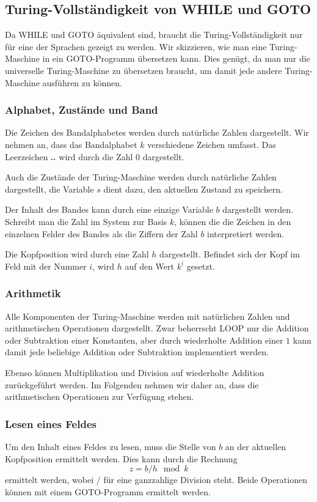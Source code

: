 \subsection{Turing-Vollständigkeit von WHILE und GOTO}
Da WHILE und GOTO äquivalent sind, braucht die Turing-Vollständigkeit
nur für eine der Sprachen gezeigt zu werden.
Wir skizzieren, wie man eine Turing-Maschine in ein GOTO-Programm
übersetzen kann. Dies genügt, da man nur die universelle
Turing-Maschine zu übersetzen braucht, um damit jede andere
Turing-Maschine ausführen zu können.

\subsubsection{Alphabet, Zustände und Band}
Die Zeichen des Bandalphabetes werden durch natürliche Zahlen
dargestellt.  Wir nehmen an, dass das Bandalphabet $k$ verschiedene Zeichen
umfasst. Das Leerzeichen $\text{\textvisiblespace}$ wird durch die Zahl $0$
dargestellt.

Auch die Zustände der Turing-Maschine werden durch natürliche Zahlen
dargestellt,
die Variable $s$ dient dazu, den aktuellen Zustand zu
speichern.

Der Inhalt des Bandes kann durch eine einzige Variable $b$ dargestellt
werden. Schreibt man die Zahl im System zur Basis $k$, können die
die Zeichen in den einzelnen Felder des Bandes als die Ziffern
der Zahl $b$ interpretiert werden.

Die Kopfposition wird durch eine Zahl $h$ dargestellt. Befindet sich
der Kopf im Feld mit der Nummer $i$, wird $h$ auf den Wert $k^i$
gesetzt.

\subsubsection{Arithmetik}
Alle Komponenten der Turing-Maschine werden mit natürlichen Zahlen
und arithmetischen Operationen dargestellt.
Zwar beherrscht LOOP nur die Addition oder Subtraktion einer Konstanten,
aber durch wiederholte Addition einer $1$ kann damit jede beliebige
Addition oder Subtraktion implementiert werden.

Ebenso können Multiplikation und Division auf wiederholte Addition
zurückgeführt werden.
Im Folgenden nehmen wir daher an, dass die arithmetischen Operationen
zur Verfügung stehen.

\subsubsection{Lesen eines Feldes}
Um den Inhalt eines Feldes zu lesen, muss die Stelle von $b$ an der
aktuellen Kopfposition ermittelt werden.
Dies kann durch die Rechnung
\begin{equation}
z=b / h \mod k
\label{getchar}
\end{equation}
ermittelt werden, wobei $/$ für eine ganzzahlige Division steht.
Beide Operationen können mit einem GOTO-Programm ermittelt werden.


